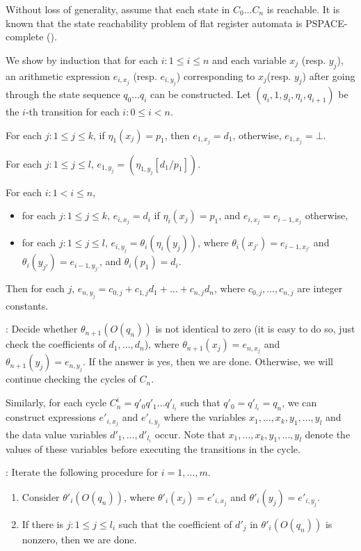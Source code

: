 \documentclass[11pt]{article}
\def\Ss{{\mathcal{S} }}
\begin{document}
Without loss of generality, assume that each state in $C_0 \dots C_n$ is reachable. It is known that the state reachability problem of flat register automata is PSPACE-complete (\cite{DL09}). 


We show by induction that for each $i: 1 \le i \le n$ and each variable $x_j$ (resp. $y_j$), an arithmetic expression $e_{i,x_j}$ (resp. $e_{i,y_j}$) corresponding to $x_j$(resp. $y_j$) after going through the state sequence $q_0 \dots q_i$ can be constructed. Let $(q_{i}, 1, g_{i}, \eta_{i}, q_{i+1})$ be the $i$-th transition for each $i: 0 \le i < n$.

For each $j: 1 \le j \le k$, if $\eta_1(x_j)=p_1$, then $e_{1,x_j}=d_1$, otherwise, $e_{1,x_j}=\bot$.

For each $j: 1 \le j \le l$, $e_{1,y_j} = (\eta_{1,y_j}[d_1/p_1])$. 

For each $i: 1 < i \le n$, 
\begin{itemize}
\item for each $j: 1 \le j \le k$, $e_{i,x_j}=d_i$ if $\eta_i(x_j)=p_1$, and $e_{i,x_j}=e_{i-1,x_j}$ otherwise,
%
\item for each $j: 1 \le j \le l$, $e_{i,y_j} = \theta_i(\eta_i(y_j))$, where $\theta_i(x_{j'})=e_{i-1,x_{j'}}$ and $\theta_i(y_{j'})=e_{i-1, y_{j'}}$, and $\theta_i(p_1)=d_i$.
\end{itemize}

Then for each $j$, $e_{n,y_j} = c_{0,j} + c_{1,j} d_1 + \dots + c_{n,j} d_n$, where $c_{0,j},\dots, c_{n,j}$ are integer constants.

\smallskip

: Decide whether $\theta_{n+1}(O(q_n))$ is not identical to zero (it is easy to do so, just check the coefficients of $d_1,\dots,d_n$), where $\theta_{n+1}(x_j)=e_{n,x_j}$ and $\theta_{n+1}(y_j)=e_{n,y_j}$. If the answer is yes, then we are done. Otherwise, we will continue checking the cycles of $C_n$.

Similarly, for each cycle $C^i_n = q'_0 q'_1 \dots q'_{l_i}$ such that $q'_0 = q'_{l_i}=q_n$, we can construct expressions $e'_{i,x_j}$ and $e'_{i,y_j}$ where the variables $x_1,\dots,x_k,y_1,\dots,y_l$ and the data value variables $d'_1,\dots,d'_{l_i}$ occur. Note that $x_1,\dots,x_k,y_1,\dots,y_l$ denote the values of these variables before executing the transitions in the cycle.

\smallskip

: Iterate the following procedure for $i = 1, \dots, m$.
\begin{enumerate}
\item Consider $\theta'_i(O(q_n))$, where $\theta'_i(x_j)=e'_{i,x_j}$ and $\theta'_i(y_j)=e'_{i,y_j}$. 
%
\item If there is $j: 1 \le j \le l_i$ such that the coefficient of $d'_j$ in $\theta'_i(O(q_n))$ is nonzero, then we are done. 
\end{enumerate}
\end{document}
